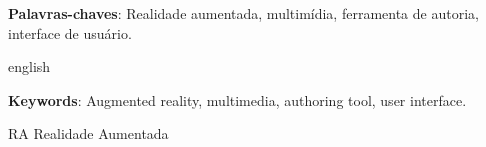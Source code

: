 \documentclass[
	12pt,				%
	openright,			%
	oneside,			%
	a4paper,			%
	ho do papel. 
	english,			%
	french,				%
	spanish,			%
	brazil,				%
	]{abntex2}
\begin{document}


\begin{resumo}
 

\noindent
\textbf{Palavras-chaves}: Realidade aumentada, multimídia, ferramenta de autoria, interface de usuário.

\end{resumo}

% 
\begin{resumo}[Abstract]
\begin{otherlanguage*}{english}


\noindent
\textbf{Keywords}: Augmented reality, multimedia, authoring tool, user interface.
\end{otherlanguage*}
\end{resumo}
\cleardoublepage
\listoffigures*
\cleardoublepage

\listoftables*
\cleardoublepage

\begin{siglas}

  \item[RA] Realidade Aumentada
  
  
\end{siglas}


\tableofcontents*
\cleardoublepage


\textual

 

 

 

 

 

\postextual


\end{document}
